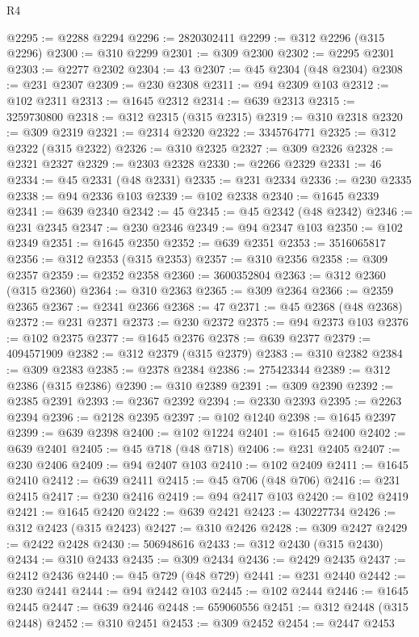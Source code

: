 \begin{lexlean}{R4}
\begin{coremodule}
@2295 := @2288 @2294
@2296 := 2820302411
@2299 := @312 @2296 (@315 @2296)
@2300 := @310 @2299
@2301 := @309 @2300
@2302 := @2295 @2301
@2303 := @2277 @2302
@2304 := 43
@2307 := @45 @2304 (@48 @2304)
@2308 := @231 @2307
@2309 := @230 @2308
@2311 := @94 @2309 @103
@2312 := @102 @2311
@2313 := @1645 @2312
@2314 := @639 @2313
@2315 := 3259730800
@2318 := @312 @2315 (@315 @2315)
@2319 := @310 @2318
@2320 := @309 @2319
@2321 := @2314 @2320
@2322 := 3345764771
@2325 := @312 @2322 (@315 @2322)
@2326 := @310 @2325
@2327 := @309 @2326
@2328 := @2321 @2327
@2329 := @2303 @2328
@2330 := @2266 @2329
@2331 := 46
@2334 := @45 @2331 (@48 @2331)
@2335 := @231 @2334
@2336 := @230 @2335
@2338 := @94 @2336 @103
@2339 := @102 @2338
@2340 := @1645 @2339
@2341 := @639 @2340
@2342 := 45
@2345 := @45 @2342 (@48 @2342)
@2346 := @231 @2345
@2347 := @230 @2346
@2349 := @94 @2347 @103
@2350 := @102 @2349
@2351 := @1645 @2350
@2352 := @639 @2351
@2353 := 3516065817
@2356 := @312 @2353 (@315 @2353)
@2357 := @310 @2356
@2358 := @309 @2357
@2359 := @2352 @2358
@2360 := 3600352804
@2363 := @312 @2360 (@315 @2360)
@2364 := @310 @2363
@2365 := @309 @2364
@2366 := @2359 @2365
@2367 := @2341 @2366
@2368 := 47
@2371 := @45 @2368 (@48 @2368)
@2372 := @231 @2371
@2373 := @230 @2372
@2375 := @94 @2373 @103
@2376 := @102 @2375
@2377 := @1645 @2376
@2378 := @639 @2377
@2379 := 4094571909
@2382 := @312 @2379 (@315 @2379)
@2383 := @310 @2382
@2384 := @309 @2383
@2385 := @2378 @2384
@2386 := 275423344
@2389 := @312 @2386 (@315 @2386)
@2390 := @310 @2389
@2391 := @309 @2390
@2392 := @2385 @2391
@2393 := @2367 @2392
@2394 := @2330 @2393
@2395 := @2263 @2394
@2396 := @2128 @2395
@2397 := @102 @1240
@2398 := @1645 @2397
@2399 := @639 @2398
@2400 := @102 @1224
@2401 := @1645 @2400
@2402 := @639 @2401
@2405 := @45 @718 (@48 @718)
@2406 := @231 @2405
@2407 := @230 @2406
@2409 := @94 @2407 @103
@2410 := @102 @2409
@2411 := @1645 @2410
@2412 := @639 @2411
@2415 := @45 @706 (@48 @706)
@2416 := @231 @2415
@2417 := @230 @2416
@2419 := @94 @2417 @103
@2420 := @102 @2419
@2421 := @1645 @2420
@2422 := @639 @2421
@2423 := 430227734
@2426 := @312 @2423 (@315 @2423)
@2427 := @310 @2426
@2428 := @309 @2427
@2429 := @2422 @2428
@2430 := 506948616
@2433 := @312 @2430 (@315 @2430)
@2434 := @310 @2433
@2435 := @309 @2434
@2436 := @2429 @2435
@2437 := @2412 @2436
@2440 := @45 @729 (@48 @729)
@2441 := @231 @2440
@2442 := @230 @2441
@2444 := @94 @2442 @103
@2445 := @102 @2444
@2446 := @1645 @2445
@2447 := @639 @2446
@2448 := 659060556
@2451 := @312 @2448 (@315 @2448)
@2452 := @310 @2451
@2453 := @309 @2452
@2454 := @2447 @2453

\end{coremodule}
\end{lexlean}
